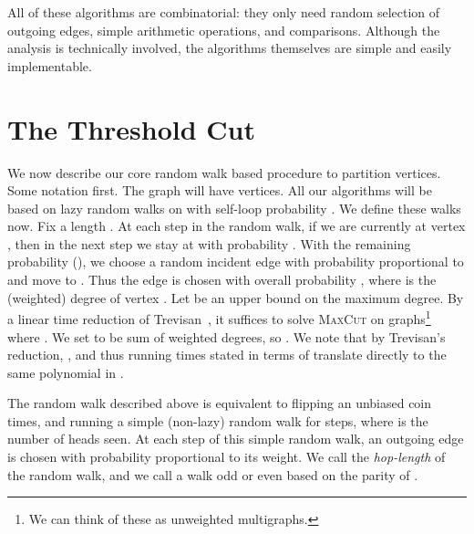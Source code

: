 \documentclass[11pt]{article}
\def\maxcut{\textsc{MaxCut}\xspace}
\begin{document}
All of these algorithms are combinatorial: they only need random selection of outgoing edges, simple arithmetic operations, and comparisons. Although the analysis is technically involved, the algorithms themselves are simple and easily implementable.


\section{The Threshold Cut} \label{sec:cut}

We now describe our core random walk based procedure to partition vertices.
Some notation first.
The graph  will have  vertices. All our algorithms will be based on lazy
random walks on  with self-loop probability . We define these walks now. Fix a
length . At each step in the random walk, if we are currently
at vertex , then in the next step we stay at  with probability .
With the remaining probability (), we choose a random incident edge  with probability proportional to  and move to . Thus the edge
 is chosen with overall probability , where  is the (weighted) degree of vertex . Let
 be an upper bound on the maximum degree. By a linear time reduction of
Trevisan~\cite{Tre01,Tre09}, it suffices to solve \maxcut on graphs\footnote{We
can think of these as unweighted multigraphs.} where .
We set  to be sum of weighted degrees, so . We note that by
Trevisan's reduction, , and thus running times stated in terms
of  translate directly to the same polynomial in .


The random walk described above is equivalent to flipping an unbiased coin  times, and running a simple (non-lazy) random walk for  steps, where  is the number of heads seen. At each step of this simple random walk, an outgoing edge is chosen with probability proportional to its weight. We call  the {\em hop-length} of the random walk, and we call a walk odd or even based on the parity of .
\end{document}
